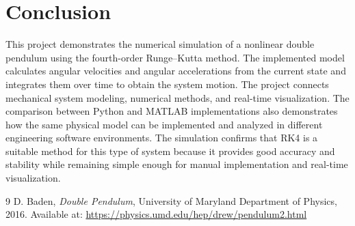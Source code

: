 \documentclass[12pt,a4paper]{article}
\begin{document}
\section{Conclusion}

This project demonstrates the numerical simulation of a nonlinear double pendulum using the fourth-order Runge--Kutta method. The implemented model calculates angular velocities and angular accelerations from the current state and integrates them over time to obtain the system motion. The project connects mechanical system modeling, numerical methods, and real-time visualization. The comparison between Python and MATLAB implementations also demonstrates how the same physical model can be implemented and analyzed in different engineering software environments. The simulation confirms that RK4 is a suitable method for this type of system because it provides good accuracy and stability while remaining simple enough for manual implementation and real-time visualization.

\newpage

\tableofcontents
\begin{thebibliography}{9}
D. Baden,
\textit{Double Pendulum},
University of Maryland Department of Physics,
2016.
Available at:
\url{https://physics.umd.edu/hep/drew/pendulum2.html}
\end{thebibliography}
\end{document}
